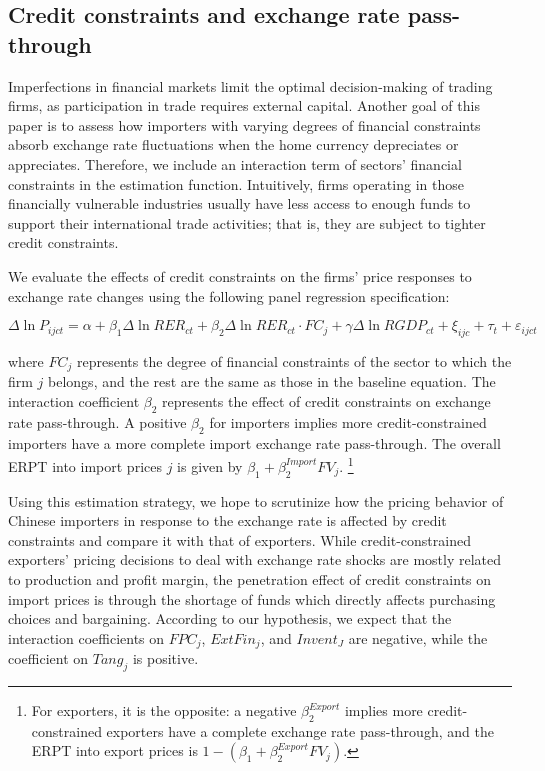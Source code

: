 \subsection{Credit constraints and exchange rate pass-through} \label{Empirical-Credit}

Imperfections in financial markets limit the optimal decision-making of trading firms, as participation in trade requires external capital. Another goal of this paper is to assess how importers with varying degrees of financial constraints absorb exchange rate fluctuations when the home currency depreciates or appreciates. Therefore, we include an interaction term of sectors’ financial constraints in the estimation function. Intuitively, firms operating in those financially vulnerable industries usually have less access to enough funds to support their international trade activities; that is, they are subject to tighter credit constraints. 

We evaluate the effects of credit constraints on the firms' price responses to exchange rate changes using the following panel regression specification:

\begin{equation}
	\Delta \ln P_{ijct}=\alpha+\beta_{1} \Delta \ln RER_{ct}+\beta_{2} \Delta \ln RER_{ct} \cdot FC_{j}+\gamma \Delta \ln RGDP_{ct}+\xi_{ijc}+\tau_{t} +\varepsilon_{ijct}
	\label{eq.credit}
\end{equation}

where $FC_{j}$ represents the degree of financial constraints of the sector to which the firm $j$ belongs, and the rest are the same as those in the baseline equation. The interaction coefficient $\beta_2$ represents the effect of credit constraints on exchange rate pass-through. A positive $\beta_2$ for importers implies more credit-constrained importers have a more complete import exchange rate pass-through. The overall ERPT into import prices $j$ is given by $\beta_{1} +\beta^{Import}_{2} FV_j$. \footnote{For exporters, it is the opposite: a negative $\beta^{Export}_2$ implies more credit-constrained exporters have a complete exchange rate pass-through, and the ERPT into export prices is $1-(\beta_{1} +\beta^{Export}_{2} FV_j)$.}

Using this estimation strategy, we hope to scrutinize how the pricing behavior of Chinese importers in response to the exchange rate is affected by credit constraints and compare it with that of exporters. While credit-constrained exporters’ pricing decisions to deal with exchange rate shocks are mostly related to production and profit margin, the penetration effect of credit constraints on import prices is through the shortage of funds which directly affects purchasing choices and bargaining. According to our hypothesis, we expect that the interaction coefficients on $FPC_{j}$, $ExtFin_j$, and $Invent_J$ are negative, while the coefficient on $Tang_j$ is positive.

